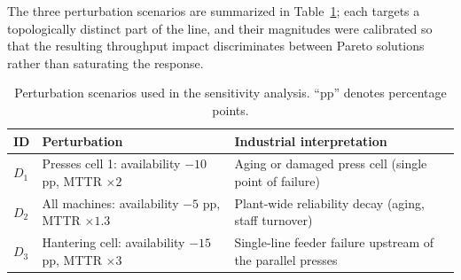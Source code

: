 \documentclass[a4paper,fleqn]{cas-sc}
\begin{document}
  The three perturbation scenarios are summarized in                                                                                        
  Table~\ref{tab:res_scenarios}; each targets a topologically distinct                                                                      
  part of the line, and their magnitudes were calibrated so that the                                                                        
  resulting throughput impact discriminates between Pareto solutions                                                                        
  rather than saturating the response.                                                                                                      
                                                                                                                                            
  \begin{table}[htbp]                                                                                                                       
  \centering                                                                                                                                
  \caption{Perturbation scenarios used in the sensitivity analysis. ``pp'' denotes percentage points.}                                      
  \label{tab:res_scenarios}                                                                                                                 
  \begin{tabular}{@{}l l l@{}}                                                                                                              
  \toprule                                                                                                                                  
  \textbf{ID} & \textbf{Perturbation} & \textbf{Industrial interpretation} \\                                                               
  \midrule                                                                                                                                  
  $D_1$ & Presses cell 1: availability $-10$ pp, MTTR $\times 2$ & Aging or damaged press cell (single point of failure) \\                 
  $D_2$ & All machines: availability $-5$ pp, MTTR $\times 1.3$ & Plant-wide reliability decay (aging, staff turnover) \\                   
  $D_3$ & Hantering cell: availability $-15$ pp, MTTR $\times 3$ & Single-line feeder failure upstream of the parallel presses \\           
  \bottomrule                                                                                                                               
  \end{tabular}                                                                                                                             
  \end{table}                                                                                                                               
                                                                                                                                            
\end{document}
